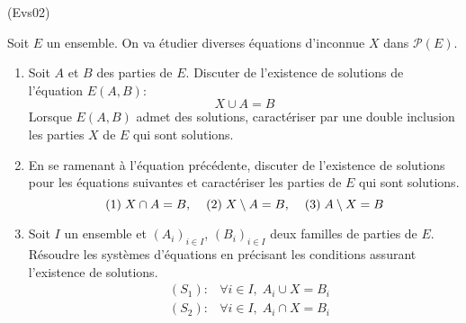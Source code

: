 \begin{tiny}(Evs02)\end{tiny} Soit $E$ un ensemble. On va étudier diverses équations d'inconnue $X$ dans $\mathcal{P}(E)$.
\begin{enumerate}
 \item Soit  $A$ et $B$ des parties de $E$. Discuter de l'existence de solutions de l'équation $E(A,B)$:
\begin{displaymath}
 X\cup A=B
\end{displaymath}
Lorsque $E(A,B)$ admet des solutions, caractériser par une double inclusion les parties $X$ de $E$ qui sont solutions.
 \item  En se ramenant à l'équation précédente, discuter  de l'existence de solutions pour les équations suivantes et caractériser les parties de $E$ qui sont solutions.
\begin{displaymath}
 (1)\; X\cap A=B, \hspace{0.4cm}(2)\;X\setminus A=B , \hspace{0.4cm}(3)\;A\setminus X=B
\end{displaymath}
\item Soit $I$ un ensemble et $\left( A_i\right) _{i\in I}$, $\left( B_i\right) _{i\in I}$ deux familles de parties de $E$. Résoudre les systèmes d'équations en précisant les conditions assurant l'existence de solutions.
\begin{align*}
 &(S_1):& \forall i\in I, \; A_i \cup X =B_i \\
 &(S_2):& \forall i\in I, \; A_i \cap X =B_i  
\end{align*}
\end{enumerate}
 